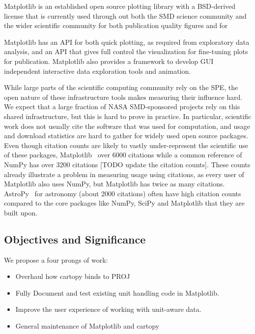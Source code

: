 \documentclass[12pt]{article}
\numberwithin{page}{section}
\begin{document}
Matplotlib \cite{Hunter:2007} is an established open source plotting
library with a BSD-derived license that is currently used through out
both the SMD science community and the wider scientific community for
both publication quality figures and for

Matplotlib has an API for both quick plotting, as required from
exploratory data analysis, and an API that gives full control the
visualization for fine-tuning plots for publication.  Matplotlib also
provides a framework to develop GUI independent interactive data
exploration tools and animation.

While large parts of the scientific computing community rely on the
SPE, the open nature of these infrastructure tools makes measuring
their influence hard.  We expect that a large fraction of NASA
SMD-sponsored projects rely on this shared infrastructure, but this is
hard to prove in practice.  In particular, scientific work does not
usually cite the software that was used for computation, and usage and
download statistics are hard to gather for widely used open source
packages.  Even though citation counts are likely to vastly
under-represent the scientific use of these packages,
Matplotlib~\cite{Hunter:2007} over 6000 citations while a
common reference of NumPy\cite{walt2011numpy} has over 3200 citations
[TODO update the citation counts]. These counts already illustrate a
problem in measuring usage using citations, as every user of
Matplotlib also uses NumPy, but Matplotlib has twice as
many citations.   AstroPy~\cite{robitaille2013astropy} for
astronomy (about 2000 citations) often have high citation counts
compared to the core packages like NumPy, SciPy and Matplotlib that
they are built upon.


\subsection{Objectives and Significance}
We propose a four prongs of work:

\begin{itemize}
\item Overhaul how cartopy binds to PROJ
\item Fully Document and test existing unit handling code in Matplotlib.
\item Improve the user experience of working with unit-aware data.
\item General maintenance of Matplotlib and cartopy
\end{itemize}
\end{document}
